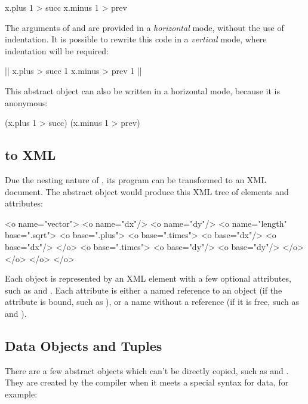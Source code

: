 \begin{ffcode}
[x]
  x.plus 1 > succ
  x.minus 1 > prev
\end{ffcode}

The arguments of  and  are provided in a \emph{horizontal}
mode, without the use of indentation. It is possible to rewrite this code
in a \emph{vertical} mode, where indentation will be required:

\begin{ffcode}
[x] |$\label{ln:succ}$|
  x.plus > succ
    1
  x.minus > prev
    1 |$\label{ln:succ-end}$|
\end{ffcode}

This abstract object can also be written in a horizontal mode,
because it is anonymous:

\begin{ffcode}
[x] (x.plus 1 > succ) (x.minus 1 > prev)
\end{ffcode}

\subsection{\eo{} to XML}\label{sec:xml}

Due the nesting nature of \eo{}, its program can be transformed
to an XML document. The abstract object  would produce
this XML tree of elements and attributes:

\begin{ffcode}
<o name="vector">
  <o name="dx"/>
  <o name="dy"/>
  <o name="length" base=".sqrt">
    <o base=".plus">
      <o base=".times">
        <o base="dx"/>
        <o base="dx"/>
      </o>
      <o base=".times">
        <o base="dy"/>
        <o base="dy"/>
      </o>
    </o>
  </o>
</o>
\end{ffcode}

Each object is represented by an  XML element with a few
optional attributes, such as  and . Each
attribute is either a named reference to an object (if the attribute is bound,
such as ), or a name without a reference (if it is free,
such as  and ).

\subsection{Data Objects and Tuples}

There are a few abstract objects which can't be directly copied, such as
 and . They are created by the compiler when it meets
a special syntax for data, for example:

